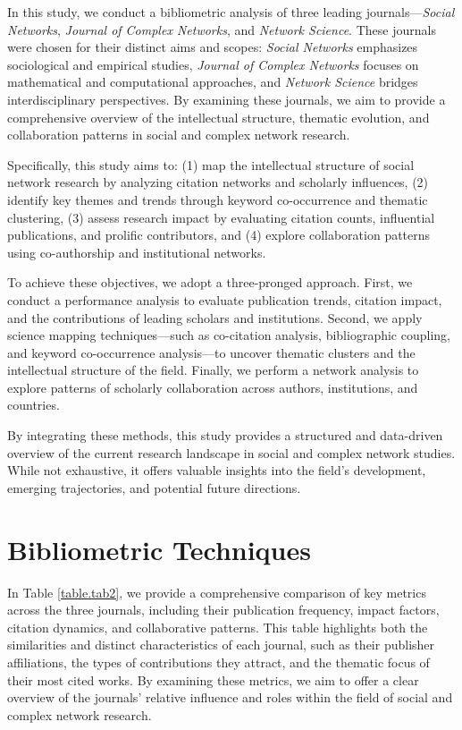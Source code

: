 \documentclass[twocolumn]{article}
\begin{document}
	In this study, we conduct a bibliometric analysis of three leading journals—\textit{Social Networks}, \textit{Journal of Complex Networks}, and \textit{Network Science}. These journals were chosen for their distinct aims and scopes: \textit{Social Networks} emphasizes sociological and empirical studies, \textit{Journal of Complex Networks} focuses on mathematical and computational approaches, and \textit{Network Science} bridges interdisciplinary perspectives. By examining these journals, we aim to provide a comprehensive overview of the intellectual structure, thematic evolution, and collaboration patterns in social and complex network research.
	
	Specifically, this study aims to: (1) map the intellectual structure of social network research by analyzing citation networks and scholarly influences, (2) identify key themes and trends through keyword co-occurrence and thematic clustering, (3) assess research impact by evaluating citation counts, influential publications, and prolific contributors, and (4) explore collaboration patterns using co-authorship and institutional networks.
	
	To achieve these objectives, we adopt a three-pronged approach. First, we conduct a performance analysis to evaluate publication trends, citation impact, and the contributions of leading scholars and institutions. Second, we apply science mapping techniques—such as co-citation analysis, bibliographic coupling, and keyword co-occurrence analysis—to uncover thematic clusters and the intellectual structure of the field. Finally, we perform a network analysis to explore patterns of scholarly collaboration across authors, institutions, and countries.
	
	By integrating these methods, this study provides a structured and data-driven overview of the current research landscape in social and complex network studies. While not exhaustive, it offers valuable insights into the field’s development, emerging trajectories, and potential future directions.
	
	\section{Bibliometric Techniques}\label{Bibliometric Techniques}
	
	In Table \ref{table.tab2}, we provide a comprehensive comparison of key metrics across the three journals, including their publication frequency, impact factors, citation dynamics, and collaborative patterns. This table highlights both the similarities and distinct characteristics of each journal, such as their publisher affiliations, the types of contributions they attract, and the thematic focus of their most cited works. By examining these metrics, we aim to offer a clear overview of the journals' relative influence and roles within the field of social and complex network research.
	
\end{document}
